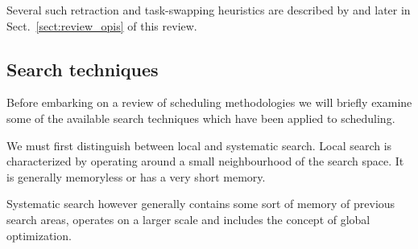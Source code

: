 Several such retraction and task-swapping heuristics are described by \citet{kramer04swapping} and later in Sect.~\ref{sect:review_opis} of this review. 


\subsection{Search techniques}
\label{sub:review_search}
Before embarking on a review of scheduling methodologies we will briefly examine some of the available search techniques which have been applied to scheduling. 



We must first distinguish between local and systematic search. Local search is characterized by operating around a small neighbourhood of the search space. It is generally memoryless or has a very short memory.

Systematic search however generally contains some sort of memory of previous search areas, operates on a larger scale and includes the concept of global optimization.


